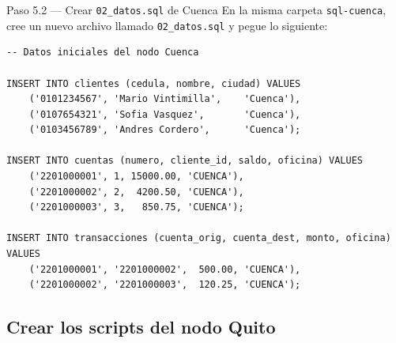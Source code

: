\documentclass[11pt,a4paper]{article}
\begin{document}
\begin{pasobox}{Paso 5.2 --- Crear \texttt{02\_datos.sql} de Cuenca}
En la misma carpeta \texttt{sql-cuenca}, cree un nuevo archivo llamado \texttt{02\_datos.sql} y pegue lo siguiente:

\begin{lstlisting}[style=sqlstyle,caption={sql-cuenca/02\_datos.sql}]
-- Datos iniciales del nodo Cuenca

INSERT INTO clientes (cedula, nombre, ciudad) VALUES
    ('0101234567', 'Mario Vintimilla',    'Cuenca'),
    ('0107654321', 'Sofia Vasquez',       'Cuenca'),
    ('0103456789', 'Andres Cordero',      'Cuenca');

INSERT INTO cuentas (numero, cliente_id, saldo, oficina) VALUES
    ('2201000001', 1, 15000.00, 'CUENCA'),
    ('2201000002', 2,  4200.50, 'CUENCA'),
    ('2201000003', 3,   850.75, 'CUENCA');

INSERT INTO transacciones (cuenta_orig, cuenta_dest, monto, oficina) VALUES
    ('2201000001', '2201000002',  500.00, 'CUENCA'),
    ('2201000002', '2201000003',  120.25, 'CUENCA');
\end{lstlisting}
\end{pasobox}

\subsection{Crear los scripts del nodo Quito}
\end{document}
